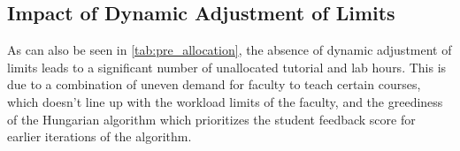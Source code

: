 \subsection{Impact of Dynamic Adjustment of Limits}

As can also be seen in \autoref{tab:pre_allocation}, the absence of dynamic adjustment of limits leads to a significant number of unallocated tutorial and lab hours. This is due to a combination of uneven demand for faculty to teach certain courses, which doesn't line up with the workload limits of the faculty, and the greediness of the Hungarian algorithm which prioritizes the student feedback score for earlier iterations of the algorithm.

\begin{table}[H]
  \centering
  \caption{Impact of Dynamic Adjustment of Limits on Tutorials}
  \label{tab:dynamic_adjustment_tutorials}
\end{table}

